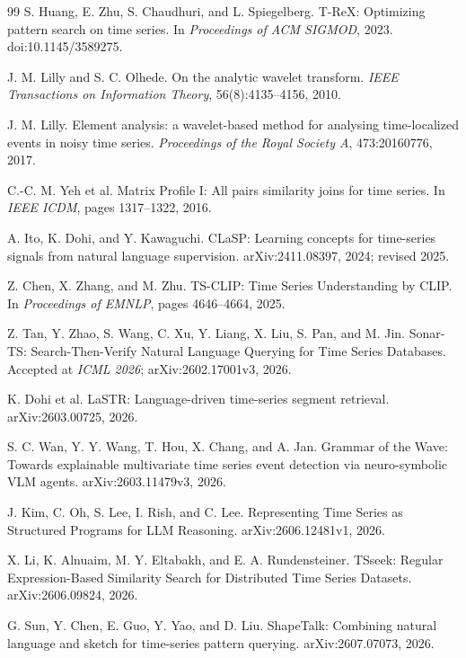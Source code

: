 \documentclass[11pt,a4paper]{article}
\begin{document}
\begin{thebibliography}{99}
S. Huang, E. Zhu, S. Chaudhuri, and L. Spiegelberg.
\newblock T-ReX: Optimizing pattern search on time series.
\newblock In \emph{Proceedings of ACM SIGMOD}, 2023. doi:10.1145/3589275.

J. M. Lilly and S. C. Olhede.
\newblock On the analytic wavelet transform.
\newblock \emph{IEEE Transactions on Information Theory}, 56(8):4135--4156, 2010.

J. M. Lilly.
\newblock Element analysis: a wavelet-based method for analysing time-localized events in noisy time series.
\newblock \emph{Proceedings of the Royal Society A}, 473:20160776, 2017.

C.-C. M. Yeh et al.
\newblock Matrix Profile I: All pairs similarity joins for time series.
\newblock In \emph{IEEE ICDM}, pages 1317--1322, 2016.

A. Ito, K. Dohi, and Y. Kawaguchi.
\newblock CLaSP: Learning concepts for time-series signals from natural language supervision.
\newblock arXiv:2411.08397, 2024; revised 2025.

Z. Chen, X. Zhang, and M. Zhu.
\newblock TS-CLIP: Time Series Understanding by CLIP.
\newblock In \emph{Proceedings of EMNLP}, pages 4646--4664, 2025.

Z. Tan, Y. Zhao, S. Wang, C. Xu, Y. Liang, X. Liu, S. Pan, and M. Jin.
\newblock Sonar-TS: Search-Then-Verify Natural Language Querying for Time Series Databases.
\newblock Accepted at \emph{ICML 2026}; arXiv:2602.17001v3, 2026.

K. Dohi et al.
\newblock LaSTR: Language-driven time-series segment retrieval.
\newblock arXiv:2603.00725, 2026.

S. C. Wan, Y. Y. Wang, T. Hou, X. Chang, and A. Jan.
\newblock Grammar of the Wave: Towards explainable multivariate time series event detection via neuro-symbolic VLM agents.
\newblock arXiv:2603.11479v3, 2026.

J. Kim, C. Oh, S. Lee, I. Rish, and C. Lee.
\newblock Representing Time Series as Structured Programs for LLM Reasoning.
\newblock arXiv:2606.12481v1, 2026.

X. Li, K. Alnuaim, M. Y. Eltabakh, and E. A. Rundensteiner.
\newblock TSseek: Regular Expression-Based Similarity Search for Distributed Time Series Datasets.
\newblock arXiv:2606.09824, 2026.

G. Sun, Y. Chen, E. Guo, Y. Yao, and D. Liu.
\newblock ShapeTalk: Combining natural language and sketch for time-series pattern querying.
\newblock arXiv:2607.07073, 2026.

\end{thebibliography}
\end{document}
